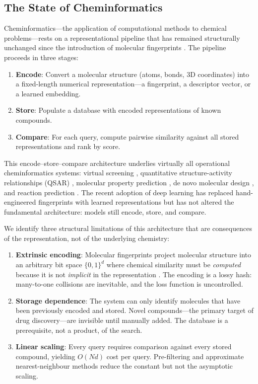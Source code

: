 \documentclass[11pt,twocolumn,a4paper]{article}
\theoremstyle{definition}
\theoremstyle{remark}
\begin{document}
\subsection{The State of Cheminformatics}

Cheminformatics---the application of computational methods to chemical problems---rests on a representational pipeline that has remained structurally unchanged since the introduction of molecular fingerprints \citep{willett1998, rogers2010}. The pipeline proceeds in three stages:

\begin{enumerate}[nosep]
\item \textbf{Encode}: Convert a molecular structure (atoms, bonds, 3D coordinates) into a fixed-length numerical representation---a fingerprint, a descriptor vector, or a learned embedding.
\item \textbf{Store}: Populate a database with encoded representations of known compounds.
\item \textbf{Compare}: For each query, compute pairwise similarity against all stored representations and rank by score.
\end{enumerate}

This encode--store--compare architecture underlies virtually all operational cheminformatics systems: virtual screening \citep{shoichet2004}, quantitative structure-activity relationships (QSAR) \citep{cherkasov2014}, molecular property prediction \citep{gilmer2017}, de novo molecular design \citep{elton2019}, and reaction prediction \citep{schwaller2019}. The recent adoption of deep learning has replaced hand-engineered fingerprints with learned representations \citep{duvenaud2015, yang2019} but has not altered the fundamental architecture: models still encode, store, and compare.

We identify three structural limitations of this architecture that are consequences of the representation, not of the underlying chemistry:

\begin{enumerate}[nosep]
\item \textbf{Extrinsic encoding}: Molecular fingerprints project molecular structure into an arbitrary bit space $\{0,1\}^d$ where chemical similarity must be \emph{computed} because it is not \emph{implicit} in the representation \citep{riniker2013}. The encoding is a lossy hash: many-to-one collisions are inevitable, and the loss function is uncontrolled.

\item \textbf{Storage dependence}: The system can only identify molecules that have been previously encoded and stored. Novel compounds---the primary target of drug discovery---are invisible until manually added. The database is a prerequisite, not a product, of the search.

\item \textbf{Linear scaling}: Every query requires comparison against every stored compound, yielding $O(Nd)$ cost per query. Pre-filtering and approximate nearest-neighbour methods \citep{johnson2019} reduce the constant but not the asymptotic scaling.
\end{enumerate}
\end{document}

